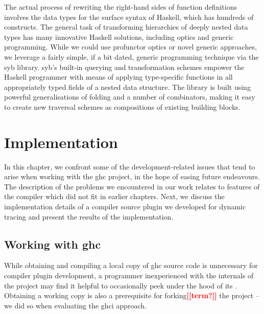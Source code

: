 \documentclass[thesis=B,english]{FITthesis}[2019/12/23]
\newcommand{\todo}[1]{\textcolor{red}{\textbf{[[#1]]}}}
\begin{document}
The actual process of rewriting the right-hand sides of function definitions
involves the data types for the surface syntax of Haskell, which has hundreds
of constructs\cite[Key~Design~Choices]{arch-ghc}. The general task of
transforming hierarchies of deeply nested data types has many innovative
Haskell solutions, including optics and generic programming. While we could use
pro\-functor optics or novel generic approaches, we leverage a fairly simple,
if a bit dated, generic programming technique via the \acrfull{syb}
library\cite{syb-paper}. \acrshort{syb}'s built-in querying and transformation
schemes empower the Haskell programmer with means of applying type-specific
functions in all appropriately typed fields of a nested data structure. The
library is built using powerful generalisations of folding and a number of
combinators, making it easy to create new traversal schemes as compositions of
existing building blocks.


\chapter{Implementation}
In this chapter, we confront some of the development-related issues that tend
to arise when working with the \acrshort{ghc} project, in the hope of easing
future endeavours. The description of the problems we encountered in our work
relates to features of the compiler which did not fit in earlier chapters.
Next, we discuss the implementation details of a compiler source plugin we
developed for dynamic tracing and present the results of the implementation.


\section{Working with \acrshort{ghc}}
While obtaining and compiling a local copy of \acrshort{ghc} source code is
unnecessary for compiler plugin development, a programmer inexperienced with
the internals of the project may find it helpful to occasionally peek under the
hood of its . Obtaining a working copy is also a prerequisite
for forking\todo{term?} the project -- we did so when evaluating the
\acrshort{ghci} approach.
\end{document}
